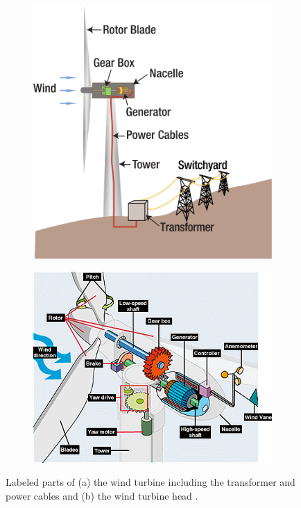 \documentclass{article}
\begin{document}
\begin{figure}
\centering
\begin{subfigure}{.5\textwidth}
  \centering
  \includegraphics[width=.75\linewidth]{figures/full_turbine_parts.png}
  \caption{}
  \label{fig:full_turbine_parts}
\end{subfigure}%
\begin{subfigure}{.7\textwidth}
  \centering
  \includegraphics[width=.75\linewidth]{figures/turbine_parts.png}
  \caption{}
  \label{fig:turbine_parts}
\end{subfigure}
\caption{Labeled parts of (a) the wind turbine including the transformer and power cables \cite{U13} and (b) the wind turbine head \cite{MX12}.}
\label{fig:test}
\end{figure}
\end{document}
